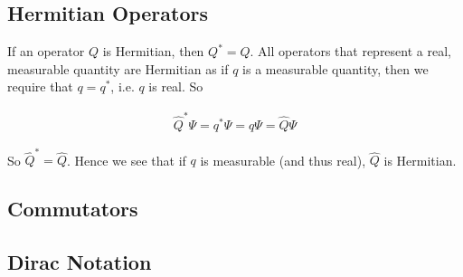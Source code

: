 \subsection{Hermitian Operators}

If an operator $Q$ is Hermitian, then $Q^* = Q$. All operators that represent a real, measurable quantity are Hermitian as if $q$ is a measurable quantity, then we require that $q = q^*$, i.e. $q$ is real. So

\begin{align*}
\hat{Q}^*\Psi = q^*\Psi = q\Psi = \hat{Q}\Psi
\end{align*}

So $\hat{Q}^* = \hat{Q}$. Hence we see that if $q$ is measurable (and thus real), $\hat{Q}$ is Hermitian.


\subsection{Commutators}
\subsection{Dirac Notation}